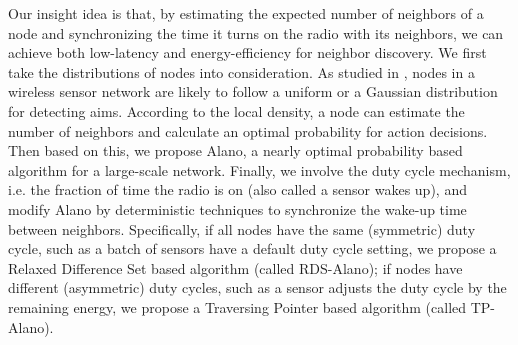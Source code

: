 Our insight idea is that, by estimating the expected number of neighbors of a node and synchronizing the time it turns on the radio with its neighbors, 
we can achieve both low-latency and energy-efficiency for neighbor discovery. 
We first take the distributions of nodes into consideration. As studied in \cite{wang2013gaussian}, nodes in a wireless sensor network are likely to follow a uniform or a Gaussian distribution for detecting aims. %
According to the local density, a node can estimate the number of neighbors and calculate an optimal probability for action decisions. Then based on this, we propose Alano, %
a nearly optimal probability based algorithm for a large-scale network. Finally, we involve the duty cycle mechanism, i.e. the fraction of time the radio is on (also called a sensor wakes up), and modify Alano by deterministic techniques to synchronize the wake-up time between neighbors. Specifically, if all nodes have the same (symmetric) duty cycle, such as a batch of sensors have a default duty cycle setting, we propose a Relaxed Difference Set based algorithm (called RDS-Alano); if nodes have different (asymmetric) duty cycles, such as a sensor adjusts the duty cycle by the remaining energy, we propose a Traversing Pointer based algorithm (called TP-Alano).

